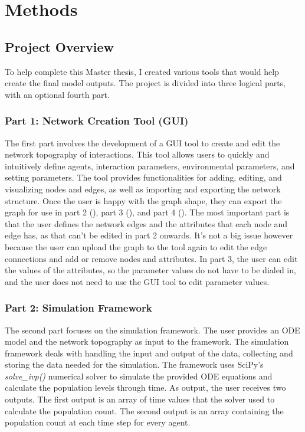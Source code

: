 \chapter{Methods}
\label{Methods}
\section{Project Overview}
To help complete this Master thesis, I created various tools that would help create the final model outputs.
The project is divided into three logical parts, with an optional fourth part.


\subsection{Part 1: Network Creation Tool (GUI)}
\label{sec:part1}
The first part involves the development of a GUI tool to create and edit the network topography of interactions.
This tool allows users to quickly and intuitively define agents, interaction parameters, environmental parameters, and setting parameters.
The tool provides functionalities for adding, editing, and visualizing nodes and edges, as well as importing and exporting the network structure. \newline 
Once the user is happy with the graph shape, they can export the graph for use in part 2 (), part 3 (), and part 4 (). 
The most important part is that the user defines the network edges and the attributes that each node and edge has, as that can't be edited in part 2 onwards. 
It's not a big issue however because the user can upload the graph to the tool again to edit the edge connections and add or remove nodes and attributes. 
In part 3, the user can edit the values of the attributes, so the parameter values do not have to be dialed in, and the user does not need to use the GUI tool to edit parameter values. 


\subsection{Part 2: Simulation Framework}
\label{sec:part2}
The second part focuses on the simulation framework.
The user provides an ODE model and the network topography as input to the framework.
The simulation framework deals with handling the input and output of the data, collecting and storing the data needed for the simulation.
The framework uses SciPy's \textit{solve\_ivp()} numerical solver to simulate the provided ODE equations and calculate the population levels through time.
As output, the user receives two outputs.
The first output is an array of time values that the solver used to calculate the population count.
The second output is an array containing the population count at each time step for every agent.


